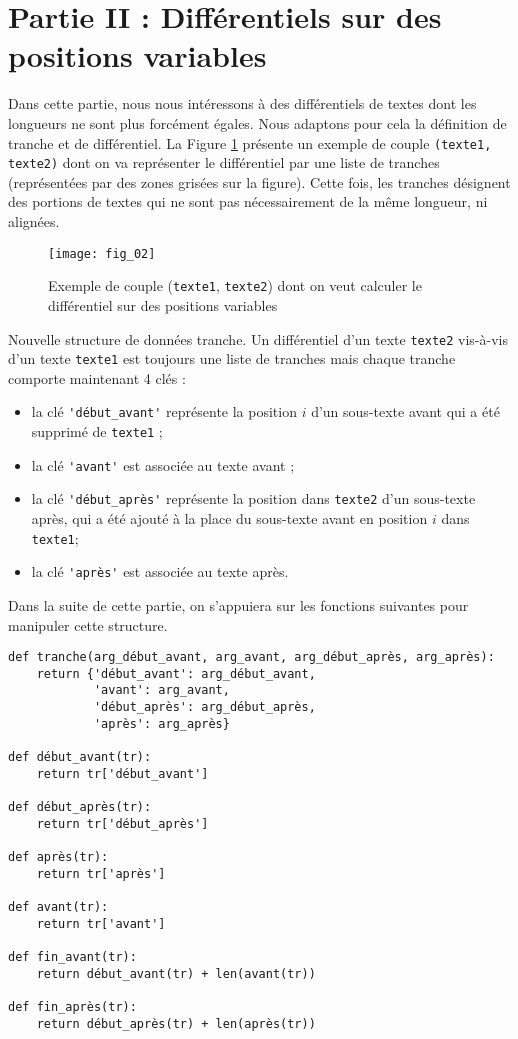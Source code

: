 \section*{Partie II : Différentiels sur des positions variables}

Dans cette partie, nous nous intéressons à des différentiels de textes dont les longueurs ne
sont plus forcément égales. Nous adaptons pour cela la définition de tranche et de différentiel. La
Figure \ref{fig:02} présente un exemple de couple \lstinline{(texte1, texte2)} dont on va représenter le différentiel
par une liste de tranches (représentées par des zones grisées sur la figure). Cette fois, les tranches
désignent des portions de textes qui ne sont pas nécessairement de la même longueur, ni alignées.

\begin{figure}[H]
\centering
\texttt{[image: fig\_02]}
\caption{Exemple de couple (\lstinline{texte1}, \lstinline{texte2}) dont on veut calculer le différentiel sur des
positions variables \label{fig:02}}
\end{figure}


Nouvelle structure de données tranche. Un différentiel d'un texte \lstinline{texte2} vis-à-vis d'un
texte \lstinline{texte1} est toujours une liste de tranches mais chaque tranche comporte maintenant 4 clés :
\begin{itemize}
\item la clé \lstinline{'début_avant'} représente la position $i$ d'un sous-texte avant qui a été supprimé de
\lstinline{texte1} ;
\item la clé \lstinline{'avant'} est associée au texte avant ;
\item la clé \lstinline{'début_après'} représente la position dans \lstinline{texte2} d'un sous-texte après, qui a été
ajouté à la place du sous-texte avant en position $i$ dans \lstinline{texte1};
\item la clé \lstinline{'après'} est associée au texte après.
\end{itemize}
Dans la suite de cette partie, on s'appuiera sur les fonctions suivantes pour manipuler cette
structure.


\begin{lstlisting}
def tranche(arg_début_avant, arg_avant, arg_début_après, arg_après):
    return {'début_avant': arg_début_avant,
            'avant': arg_avant,
            'début_après': arg_début_après,
            'après': arg_après}

def début_avant(tr):
    return tr['début_avant']

def début_après(tr):
    return tr['début_après']

def après(tr):
    return tr['après']

def avant(tr):
    return tr['avant']

def fin_avant(tr):
    return début_avant(tr) + len(avant(tr))

def fin_après(tr):
    return début_après(tr) + len(après(tr))
\end{lstlisting}


